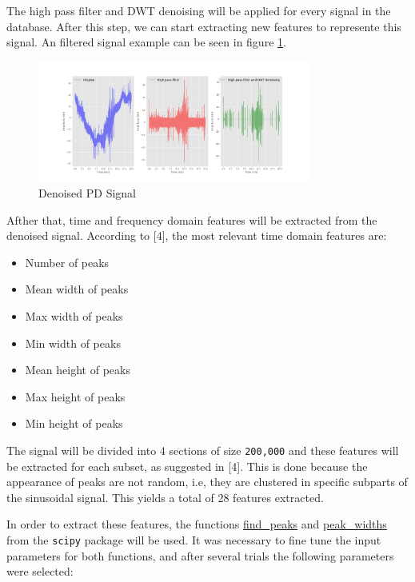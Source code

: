 \documentclass[11pt]{article}
\providecommand{\tightlist}{%
      \setlength{\itemsep}{0pt}\setlength{\parskip}{0pt}}
\begin{document}
The high pass filter and DWT denoising will be applied for every signal
in the database. After this step, we can start extracting new features
to represente this signal. An filtered signal example can be seen in
figure \ref{fig:pdsignal_dn}.

\begin{figure}[h]
\centering
\includegraphics[width=0.8\textwidth]{signal_phase_denoised.png}
\caption{Denoised PD Signal}
\label{fig:pdsignal_dn}
\end{figure}

Afther that, time and frequency domain features will be extracted from
the denoised signal. According to {[}4{]}, the most relevant time domain
features are:

\begin{itemize}
\tightlist
\item
  Number of peaks
\item
  Mean width of peaks
\item
  Max width of peaks
\item
  Min width of peaks
\item
  Mean height of peaks
\item
  Max height of peaks
\item
  Min height of peaks
\end{itemize}

The signal will be divided into 4 sections of size \texttt{200,000} and
these features will be extracted for each subset, as suggested in
{[}4{]}. This is done because the appearance of peaks are not random,
i.e, they are clustered in specific subparts of the sinusoidal signal.
This yields a total of 28 features extracted.

In order to extract these features, the functions
\href{https://docs.scipy.org/doc/scipy/reference/generated/scipy.signal.find_peaks.html}{find\_peaks}
and
\href{https://docs.scipy.org/doc/scipy/reference/generated/scipy.signal.peak_widths.html\#scipy.signal.peak_widths}{peak\_widths}
from the \texttt{scipy} package will be used. It was necessary to fine
tune the input parameters for both functions, and after several trials
the following parameters were selected:
\end{document}
